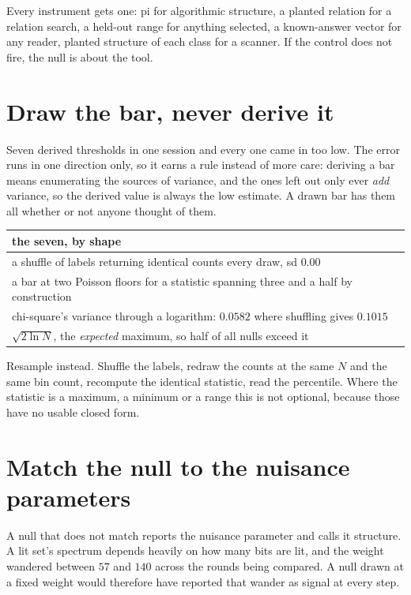 Every instrument gets one: pi for algorithmic structure, a planted relation for a relation search, a held-out range for anything selected, a known-answer vector for any reader, planted structure of each class for a scanner. If the control does not fire, the null is about the tool.

\section{Draw the bar, never derive it}

Seven derived thresholds in one session and every one came in too low. The error runs in one direction only, so it earns a rule instead of more care: deriving a bar means enumerating the sources of variance, and the ones left out only ever \emph{add} variance, so the derived value is always the low estimate. A drawn bar has them all whether or not anyone thought of them.

\begin{center}
\begin{tabular}{@{}l@{}}
\toprule
the seven, by shape \\
\midrule
a shuffle of labels returning identical counts every draw, sd \(0.00\) \\
a bar at two Poisson floors for a statistic spanning three and a half by construction \\
chi-square's variance through a logarithm: \(0.0582\) where shuffling gives \(0.1015\) \\
\(\sqrt{2 \ln N}\), the \emph{expected} maximum, so half of all nulls exceed it \\
\bottomrule
\end{tabular}
\end{center}

Resample instead. Shuffle the labels, redraw the counts at the same \(N\) and the same bin count, recompute the identical statistic, read the percentile. Where the statistic is a maximum, a minimum or a range this is not optional, because those have no usable closed form.

\section{Match the null to the nuisance parameters}

A null that does not match reports the nuisance parameter and calls it structure. A lit set's spectrum depends heavily on how many bits are lit, and the weight wandered between \(57\) and \(140\) across the rounds being compared. A null drawn at a fixed weight would therefore have reported that wander as signal at every step.

